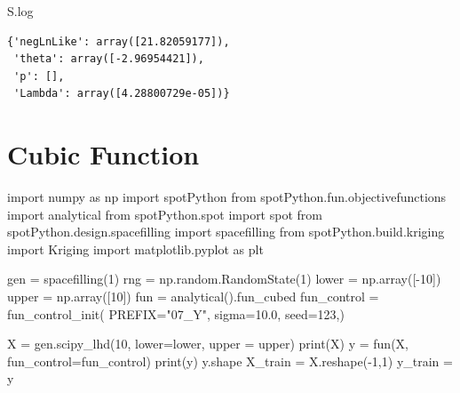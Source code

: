 \documentclass[
  letterpaper,
  DIV=11,
  numbers=noendperiod]{scrreprt}
\newenvironment{Shaded}{\begin{snugshade}}{\end{snugshade}}
\newcommand{\BuiltInTok}[1]{\textcolor[rgb]{0.00,0.23,0.31}{#1}}
\newcommand{\DecValTok}[1]{\textcolor[rgb]{0.68,0.00,0.00}{#1}}
\newcommand{\FloatTok}[1]{\textcolor[rgb]{0.68,0.00,0.00}{#1}}
\newcommand{\ImportTok}[1]{\textcolor[rgb]{0.00,0.46,0.62}{#1}}
\newcommand{\NormalTok}[1]{\textcolor[rgb]{0.00,0.23,0.31}{#1}}
\newcommand{\OperatorTok}[1]{\textcolor[rgb]{0.37,0.37,0.37}{#1}}
\newcommand{\StringTok}[1]{\textcolor[rgb]{0.13,0.47,0.30}{#1}}
\begin{document}
\begin{Shaded}
\begin{Highlighting}[]
\NormalTok{S.log}
\end{Highlighting}
\end{Shaded}

\begin{verbatim}
{'negLnLike': array([21.82059177]),
 'theta': array([-2.96954421]),
 'p': [],
 'Lambda': array([4.28800729e-05])}
\end{verbatim}

\section{Cubic Function}\label{cubic-function}

\begin{Shaded}
\begin{Highlighting}[]
\ImportTok{import}\NormalTok{ numpy }\ImportTok{as}\NormalTok{ np}
\ImportTok{import}\NormalTok{ spotPython}
\ImportTok{from}\NormalTok{ spotPython.fun.objectivefunctions }\ImportTok{import}\NormalTok{ analytical}
\ImportTok{from}\NormalTok{ spotPython.spot }\ImportTok{import}\NormalTok{ spot}
\ImportTok{from}\NormalTok{ spotPython.design.spacefilling }\ImportTok{import}\NormalTok{ spacefilling}
\ImportTok{from}\NormalTok{ spotPython.build.kriging }\ImportTok{import}\NormalTok{ Kriging}
\ImportTok{import}\NormalTok{ matplotlib.pyplot }\ImportTok{as}\NormalTok{ plt}

\NormalTok{gen }\OperatorTok{=}\NormalTok{ spacefilling(}\DecValTok{1}\NormalTok{)}
\NormalTok{rng }\OperatorTok{=}\NormalTok{ np.random.RandomState(}\DecValTok{1}\NormalTok{)}
\NormalTok{lower }\OperatorTok{=}\NormalTok{ np.array([}\OperatorTok{{-}}\DecValTok{10}\NormalTok{])}
\NormalTok{upper }\OperatorTok{=}\NormalTok{ np.array([}\DecValTok{10}\NormalTok{])}
\NormalTok{fun }\OperatorTok{=}\NormalTok{ analytical().fun\_cubed}
\NormalTok{fun\_control }\OperatorTok{=}\NormalTok{ fun\_control\_init(}
\NormalTok{    PREFIX}\OperatorTok{=}\StringTok{"07\_Y"}\NormalTok{,}
\NormalTok{    sigma}\OperatorTok{=}\FloatTok{10.0}\NormalTok{,}
\NormalTok{    seed}\OperatorTok{=}\DecValTok{123}\NormalTok{,)}

\NormalTok{X }\OperatorTok{=}\NormalTok{ gen.scipy\_lhd(}\DecValTok{10}\NormalTok{, lower}\OperatorTok{=}\NormalTok{lower, upper }\OperatorTok{=}\NormalTok{ upper)}
\BuiltInTok{print}\NormalTok{(X)}
\NormalTok{y }\OperatorTok{=}\NormalTok{ fun(X, fun\_control}\OperatorTok{=}\NormalTok{fun\_control)}
\BuiltInTok{print}\NormalTok{(y)}
\NormalTok{y.shape}
\NormalTok{X\_train }\OperatorTok{=}\NormalTok{ X.reshape(}\OperatorTok{{-}}\DecValTok{1}\NormalTok{,}\DecValTok{1}\NormalTok{)}
\NormalTok{y\_train }\OperatorTok{=}\NormalTok{ y}


\end{Highlighting}
\end{Shaded}
\end{document}

